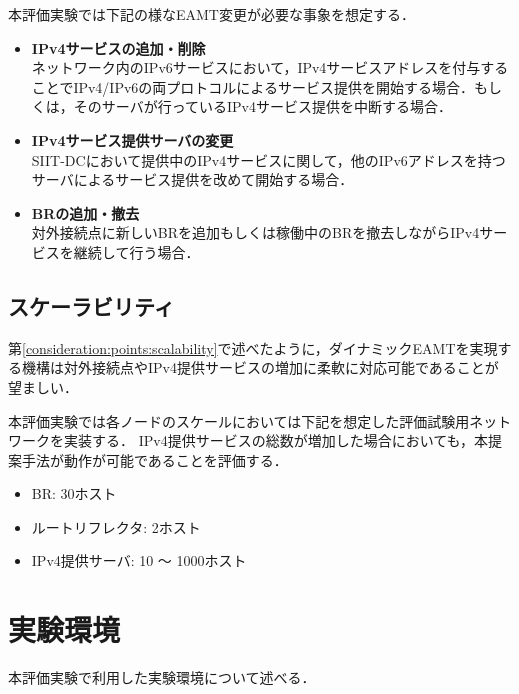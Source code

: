 本評価実験では下記の様なEAMT変更が必要な事象を想定する．

\begin{itemize}
    \item \textbf{IPv4サービスの追加・削除} \\
    ネットワーク内のIPv6サービスにおいて，IPv4サービスアドレスを付与することでIPv4/IPv6の両プロトコルによるサービス提供を開始する場合．もしくは，そのサーバが行っているIPv4サービス提供を中断する場合．
    \item \textbf{IPv4サービス提供サーバの変更} \\
    SIIT-DCにおいて提供中のIPv4サービスに関して，他のIPv6アドレスを持つサーバによるサービス提供を改めて開始する場合．
    \item \textbf{BRの追加・撤去} \\ 
    対外接続点に新しいBRを追加もしくは稼働中のBRを撤去しながらIPv4サービスを継続して行う場合．
\end{itemize}


\subsection{スケーラビリティ}
\label{evaluation:requirements:scalability}
第\ref{consideration:points:scalability}で述べたように，ダイナミックEAMTを実現する機構は対外接続点やIPv4提供サービスの増加に柔軟に対応可能であることが望ましい．

本評価実験では各ノードのスケールにおいては下記を想定した評価試験用ネットワークを実装する．
IPv4提供サービスの総数が増加した場合においても，本提案手法が動作が可能であることを評価する．

\begin{itemize}
    \item BR: 30ホスト 
    \item ルートリフレクタ: 2ホスト 
    \item IPv4提供サーバ: 10 〜 1000ホスト
\end{itemize}


\section{実験環境}
\label{evaluation:environment}

本評価実験で利用した実験環境について述べる．

